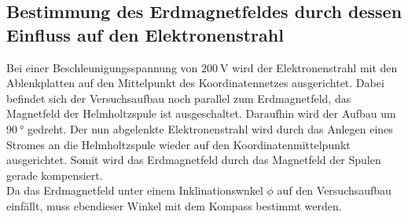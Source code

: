 \subsection{Bestimmung des Erdmagnetfeldes durch dessen Einfluss auf den Elektronenstrahl}
Bei einer Beschleunigungsspannung von $\SI{200}{\volt}$ wird der Elektronenstrahl mit den Ablenkplatten auf den Mittelpunkt des Koordinatennetzes ausgerichtet.
Dabei befindet sich der Versuchsaufbau noch parallel zum Erdmagnetfeld, das Magnetfeld der Helmholtzspule ist ausgeschaltet.
Daraufhin wird der Aufbau um $\SI{90}{\degree}$ gedreht.
Der nun abgelenkte Elektronenstrahl wird durch das Anlegen eines Stromes an die Helmholtzspule wieder auf den Koordinatenmittelpunkt ausgerichtet.
Somit wird das Erdmagnetfeld durch das Magnetfeld der Spulen gerade kompensiert.\\
Da das Erdmagnetfeld unter einem Inklinationswnkel $\phi$ auf den Versuchsaufbau einfällt, muss ebendieser Winkel mit dem Kompass bestimmt werden.

